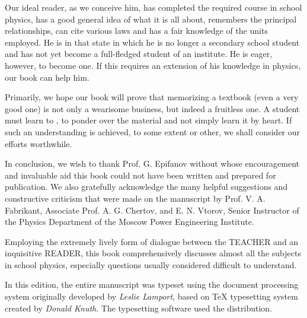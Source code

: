 \vspace{2mm}

Our ideal reader, as we conceive him, has completed the required course in school physics, has a good general idea of what it is all about, remembers the principal relationships, can cite various laws and has a fair knowledge of the units employed. He is in that  state in which he is no longer a secondary school student and has not yet become a full-fledged student of an institute. He is eager, however, to become one. If this requires an extension of his knowledge in physics, our book can help him. 

\vspace{2mm}

Primarily, we hope our book will prove that memorizing a textbook (even a very good one) is not only a wearisome business, but indeed a fruitless one. A student must learn to , to ponder over the material and not simply learn it by heart. If such an understanding is achieved, to some extent or other, we shall consider our efforts worthwhile. 

\vspace{10mm}

\thispagestyle{empty}

In conclusion, we wish to thank Prof. G. Epifanov without whose encouragement and invaluable aid this book could not have been written and prepared for publication. We also gratefully acknowledge the many helpful suggestions and constructive criticism that were made on the manuscript by Prof. V. A. Fabrikant, Associate Prof. A. G. Chertov, and E. N. Vtorov, Senior Instructor of the Physics Department of the Moscow Power Engineering Institute. 

\vspace{0.2in}

 \hfill {}
 
  \hfill {}

\vspace{0.2in}

Employing the extremely lively form of dialogue between the TEACHER and an inquisitive READER, this book comprehensively discusses almost all the subjects in school physics, especially questions usually considered difficult to understand.

\vspace{2mm}

In this edition, the entire manuscript was typeset using the \LaTeXe{} document processing system originally developed by \emph{Leslie Lamport}, based on \TeX{} typesetting system created by \emph{Donald Knuth}. The typesetting software used the  distribution.

